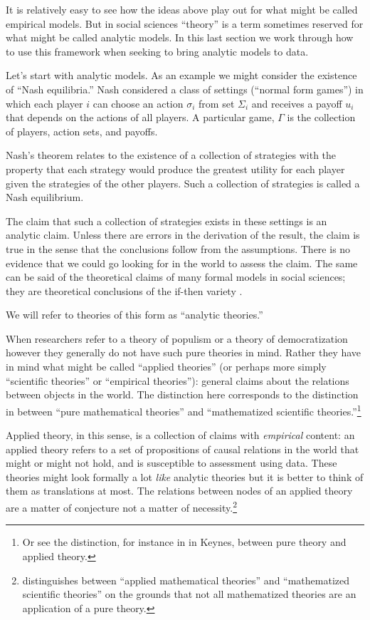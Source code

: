 \documentclass[
  12pt,
]{book}
\begin{document}
It is relatively easy to see how the ideas above play out for what might be called empirical models. But in social sciences ``theory'' is a term sometimes reserved for what might be called analytic models. In this last section we work through how to use this framework when seeking to bring analytic models to data.

Let's start with analytic models. As an example we might consider the existence of ``Nash equilibria.'' Nash considered a class of settings (``normal form games'') in which each player \(i\) can choose an action \(\sigma_i\) from set \(\Sigma_i\) and receives a payoff \(u_i\) that depends on the actions of all players. A particular game, \(\Gamma\) is the collection of players, action sets, and payoffs.

Nash's theorem relates to the existence of a collection of strategies with the property that each strategy would produce the greatest utility for each player given the strategies of the other players. Such a collection of strategies is called a Nash equilibrium.

The claim that such a collection of strategies exists in these settings is an analytic claim. Unless there are errors in the derivation of the result, the claim is true in the sense that the conclusions follow from the assumptions. There is no evidence that we could go looking for in the world to assess the claim. The same can be said of the theoretical claims of many formal models in social sciences; they are theoretical conclusions of the if-then variety \citep{clarke2012model}.

We will refer to theories of this form as ``analytic theories.''

When researchers refer to a theory of populism or a theory of democratization however they generally do not have such pure theories in mind. Rather they have in mind what might be called ``applied theories'' (or perhaps more simply ``scientific theories'' or ``empirical theories''): general claims about the relations between objects in the world. The distinction here corresponds to the distinction in \citet{peressini1999applying} between ``pure mathematical theories'' and ``mathematized scientific theories.''\footnote{Or see the distinction, for instance in in Keynes, between pure theory and applied theory.}

Applied theory, in this sense, is a collection of claims with \emph{empirical} content: an applied theory refers to a set of propositions of causal relations in the world that might or might not hold, and is susceptible to assessment using data. These theories might look formally a lot \emph{like} analytic theories but it is better to think of them as translations at most. The relations between nodes of an applied theory are a matter of conjecture not a matter of necessity.\footnote{\citet{peressini1999applying} distinguishes between ``applied mathematical theories'' and ``mathematized scientific theories'' on the grounds that not all mathematized theories are an application of a pure theory.}
\end{document}
